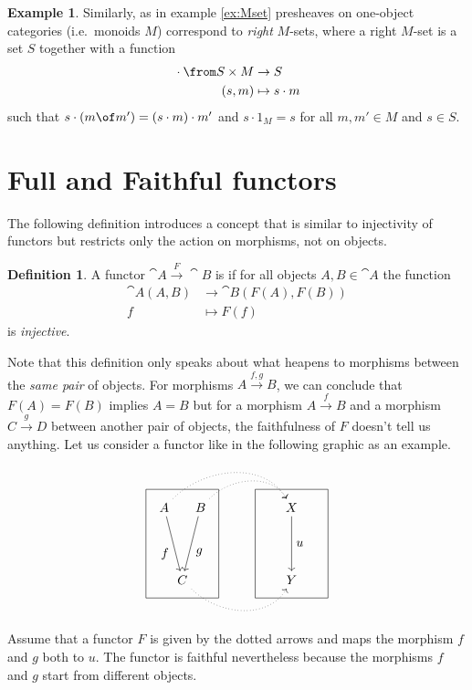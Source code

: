 \documentclass{article}
\theoremstyle{definition}
\newtheorem{definition}{Definition}
\newtheorem{example}{Example}
\begin{document}
\begin{example}
  Similarly, as in example \ref{ex:Mset} presheaves on one-object categories (i.e.\ monoids $M$) correspond to \emph{right} $M$-sets, where a right $M$-set is a set $S$ together with a function
  \begin{align*}
    {} \cdot {} \from S\times M&\to S\\
    (s,m)&\mapsto s\cdot m
  \end{align*}
  such that $s\cdot (m\of m')=(s\cdot m)\cdot m'$ and $s\cdot 1_M=s$ for all $m,m'\in M$ and $s\in S$.
\end{example}


\section{Full and Faithful functors}

The following definition introduces a concept that is similar to injectivity of functors but restricts only the action on morphisms, not on objects.

\begin{definition}
  A functor $\cat{A} \xrightarrow{F} \cat{B}$ is  if for all objects $A, B \in \cat{A}$ the function
  \begin{align*}
    \cat{A}(A, B) &\to \cat{B}(F(A), F(B)) \\
    f &\mapsto F(f)
  \end{align*}
  is \emph{injective}.
\end{definition}

Note that this definition only speaks about what heapens to morphisms between the \emph{same pair} of objects.
For morphisms $A \xrightarrow{f, g} B$, we can conclude that $F(A) = F(B)$ implies $A = B$ but for a morphism $A \xrightarrow{f} B$ and a morphism $C \xrightarrow{g} D$ between another pair of objects, the faithfulness of $F$ doesn't tell us anything.
Let us consider a functor like in the following graphic as an example.
\[ \begin{tikzpicture}
    \draw (0, 0) rectangle (2, 3);
    \node (A) at (0.5, 2.5) {$A$};
    \node (C) at (1, 0.5) {$C$};
    \node (B) at (1.5, 2.5) {$B$};
    \draw[->] (A) to node[auto, swap] {$f$} (C);
    \draw[->] (B) to node[auto] {$g$} (C);

    \draw (3, 0) rectangle (5, 3);
    \node (X) at (4, 2.5) {$X$};
    \node (Y) at (4, 0.5) {$Y$};
    \draw[->] (X) to node[auto] {$u$} (Y);

    \draw[->, dotted, out=45, in=120] (A) to (X);
    \draw[->, dotted, out=45, in=120] (B) to (X);
    \draw[->, dotted, out=-45, in=-120] (C) to (Y);
  \end{tikzpicture} \]
Assume that a functor $F$ is given by the dotted arrows and maps the morphism $f$ and $g$ both to $u$.
The functor is faithful nevertheless because the morphisms $f$ and $g$ start from different objects.
\end{document}
